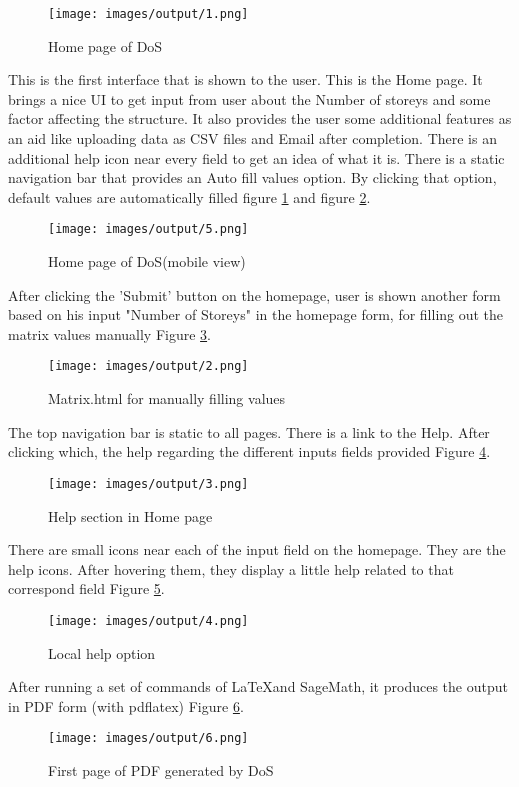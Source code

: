 \begin{figure}
\centering \texttt{[image: images/output/1.png]}
\caption{Home page of DoS}
\label{fig:1}
\end{figure}
This is the first interface that is shown to the user. This is the Home page.
It brings a nice UI to get input from user about the Number of storeys and 
some factor affecting the structure. It also provides the user some 
additional features as an aid like uploading data as CSV files and Email 
after completion. There is an additional help icon near every field to get 
an idea of what it is. There is a static navigation bar that provides an 
Auto fill values option. By clicking that option, default values are 
automatically filled figure \ref{fig:1} and figure \ref{fig:9}.
\begin{figure}
\centering \texttt{[image: images/output/5.png]}
\caption{Home page of DoS(mobile view)}
\label{fig:9}
\end{figure}  


After clicking the 'Submit' button on the homepage, user is shown another 
form based on his input "Number of Storeys" in the homepage form, for 
filling out the matrix values manually Figure \ref{fig:2}.

\begin{figure}
\centering \texttt{[image: images/output/2.png]}
\caption{Matrix.html for manually filling values}
\label{fig:2}
\end{figure}

The top navigation bar is static to all pages. There is a link to the Help. 
After clicking which, the help regarding the different inputs fields 
provided Figure \ref{fig:3}.

\begin{figure}
\centering \texttt{[image: images/output/3.png]}
\caption{Help section in Home page}
\label{fig:3}
\end{figure}

There are small icons near each of the input field on the homepage. They are 
the help icons. After hovering them, they display a little help related to
that correspond field Figure \ref{fig:4}.
\begin{figure}
\centering \texttt{[image: images/output/4.png]}
\caption{Local help option}
\label{fig:4}
\end{figure}

After running a set of commands of \LaTeX and SageMath, it produces the
output in PDF form (with pdflatex) Figure \ref{fig:5}.
\begin{figure}
\centering \texttt{[image: images/output/6.png]}
\caption{First page of PDF generated by DoS}
\label{fig:5}
\end{figure}

